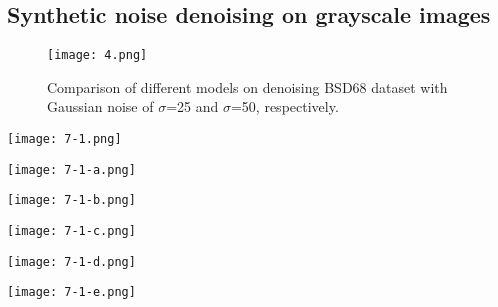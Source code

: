 \documentclass[conference]{IEEEtran}
\begin{document}
\subsection{Synthetic noise denoising on grayscale images}


\begin{figure}[t]
	\setlength{\abovecaptionskip}{0cm}
	\setlength{\belowcaptionskip}{0cm}
	\centering
	\texttt{[image: 4.png]}
	\caption{Comparison of different models on denoising BSD68 \cite{roth2005fields} dataset with Gaussian noise of $\sigma$=25 and $\sigma$=50, respectively.}
	\label{fig:figure 4}
\vspace{-1em}
\end{figure}

\begin{figure*}[t]
	\setlength{\abovecaptionskip}{0cm}
	\centering
	\begin{minipage}[b]{0.15\linewidth}
		\centering
		\texttt{[image: 7-1.png]}
	\end{minipage}
	\begin{minipage}[b]{0.15\linewidth}
		\centering
		\texttt{[image: 7-1-a.png]}
	\end{minipage}
	\begin{minipage}[b]{0.15\linewidth}
		\centering
		\texttt{[image: 7-1-b.png]}
	\end{minipage}
	\begin{minipage}[b]{0.15\linewidth}
		\centering
		\texttt{[image: 7-1-c.png]}
	\end{minipage}
	\begin{minipage}[b]{0.15\linewidth}
		\centering
		\texttt{[image: 7-1-d.png]}
	\end{minipage}
	\begin{minipage}[b]{0.15\linewidth}
		\centering
		\texttt{[image: 7-1-e.png]}
	\end{minipage}
	

\end{figure*}
\end{document}
